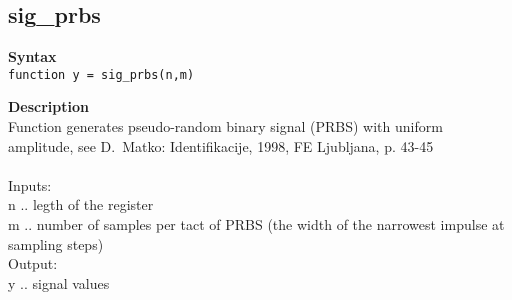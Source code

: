 \subsection*{sig\_prbs} \label{fun:sig_prbs}

\textbf{Syntax}
\\  \texttt{function y = sig\_prbs(n,m)}

\textbf{Description}
\\ Function generates pseudo-random binary signal (PRBS) with uniform
 amplitude, see D.~Matko: Identifikacije, 1998, FE Ljubljana, p.
43-45
\\
\\ Inputs:
\\ n .. legth of the register
\\ m .. number of samples per tact of PRBS (the width of the narrowest impulse at sampling steps)
\\ Output:
\\ y .. signal values
